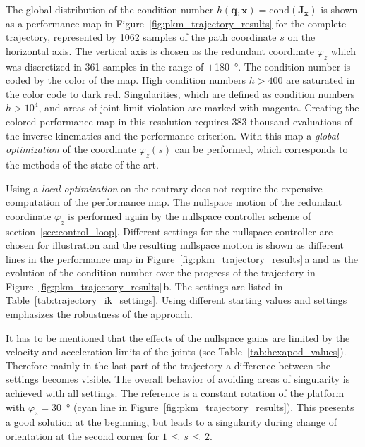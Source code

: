 \documentclass[a4paper,twoside]{article}
\begin{document}
The global distribution of the condition number $h(\bm{q},\bm{x})=\mathrm{cond}(\bm{J}_{\bm{x}})$ is shown as a performance map in Figure~\ref{fig:pkm_trajectory_results} for the complete trajectory, represented by 1062 samples of the path coordinate $s$ on the horizontal axis. %
The vertical axis is chosen as the redundant coordinate $\varphi_z$ which was discretized in 361 samples in the range of ${\pm}$\SI{180}{\degree}. %
The condition number is coded by the color of the map.
High condition numbers $h>400$ are saturated in the color code to dark red.
Singularities, which are defined as condition numbers $h>10^4$, and areas of joint limit violation are marked with magenta.
Creating the colored performance map in this resolution requires 383 thousand evaluations of the inverse kinematics and the performance criterion.
With this map a \emph{global optimization} of the coordinate $\varphi_z(s)$ can be performed, which corresponds to the methods of the state of the art.

Using a \emph{local optimization} on the contrary does not require the expensive computation of the performance map.
The nullspace motion of the redundant coordinate $\varphi_z$ is performed again by the nullspace controller scheme of section~\ref{sec:control_loop}.
Different settings for the nullspace controller are chosen for illustration and the resulting nullspace motion is shown as different lines in the performance map in Figure~\ref{fig:pkm_trajectory_results}\,a and as the evolution of the condition number over the progress of the trajectory in Figure~\ref{fig:pkm_trajectory_results}\,b.
The settings are listed in Table~\ref{tab:trajectory_ik_settings}.
Using different starting values and settings emphasizes the robustness of the approach.

It has to be mentioned that the effects of the nullspace gains are limited by the velocity and acceleration limits of the joints (see Table~\ref{tab:hexapod_values}).
%
Therefore mainly in the last part of the trajectory a difference between the settings becomes visible.
The overall behavior of avoiding areas of singularity is achieved with all settings.
The reference is a constant rotation of the platform with $\varphi_z{=}$\SI{30}{\degree} (cyan line in Figure~\ref{fig:pkm_trajectory_results}).
This presents a good solution at the beginning, but leads to a singularity during change of orientation at the second corner for $1\,{\leq}\,s\,{\leq}\,2$.
\end{document}
